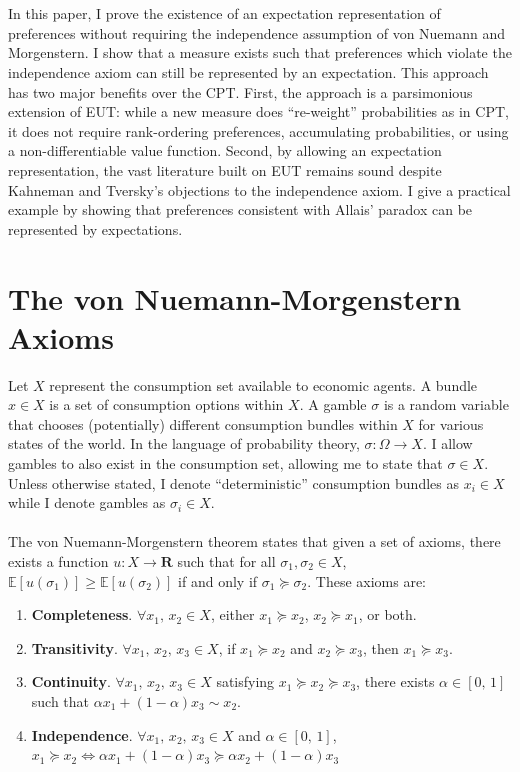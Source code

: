 \documentclass{article}
\begin{document}
\\
\\
In this paper, I prove the existence of an expectation representation of preferences without requiring the independence assumption of von Nuemann and Morgenstern.  I show that a measure exists such that preferences which violate the independence axiom can still be represented by an expectation.  This approach has two major benefits over the CPT.  First, the approach is a parsimonious extension of EUT: while a new measure does ``re-weight'' probabilities as in CPT, it does not require rank-ordering preferences, accumulating probabilities, or using a non-differentiable value function.  Second, by allowing an expectation representation, the vast literature built on EUT remains sound despite Kahneman and Tversky's objections to the independence axiom. I give a practical example by showing that preferences consistent with Allais' paradox can be represented by expectations.

\section{The von Nuemann-Morgenstern Axioms}

Let \(X\) represent the consumption set available to economic agents.  A bundle \(x \in X\) is a set of consumption options within \(X\).  A gamble \(\sigma\) is a random variable that chooses (potentially) different consumption bundles within \(X\) for various states of the world.  In the language of probability theory, \(\sigma: \Omega \to X\).  I allow gambles to also exist in the consumption set, allowing me to state that \(\sigma \in X\).  Unless otherwise stated, I denote ``deterministic'' consumption bundles as \(x_i \in X\) while I denote gambles as \(\sigma_i \in X\).
\\
\\
The von Nuemann-Morgenstern theorem states that given a set of axioms, there exists a function \(u: X \to \mathbf{R}\) such that for all \(\sigma_1, \sigma_2 \in X\), \(\mathbb{E}\left[u(\sigma_1)\right] \geq \mathbb{E}\left[u(\sigma_2)\right]\) if and only if \(\sigma_1 \succeq  \sigma_2\).  These axioms are:

\begin{enumerate}
	\item \textbf{Completeness}.  \(\forall x_1, \, x_2 \in X\), either \(x_1 \succeq  x_2\), \(x_2 \succeq  x_1\), or both.
	\item \textbf{Transitivity}.  \(\forall x_1, \, x_2,\, x_3 \in X\), if \(x_1 \succeq  x_2\) and \(x_2 \succeq  x_3\), then \(x_1 \succeq  x_3\).
	\item \textbf{Continuity}.  \(\forall x_1, \, x_2,\,x_3 \in X\) satisfying \(x_1 \succeq  x_2 \succeq  x_3\), there exists \(\alpha \in [0,\,1]\) such that \(\alpha x_1+(1-\alpha) x_3 \sim x_2\).
	\item \textbf{Independence}.  \(\forall x_1, \, x_2,\,x_3 \in X\) and \(\alpha \in [0,\,1]\), \(x_1 \succeq  x_2 \Leftrightarrow \alpha x_1+(1-\alpha)x_3 \succeq  \alpha x_2 +(1-\alpha)x_3\)
\end{enumerate}
\end{document}
